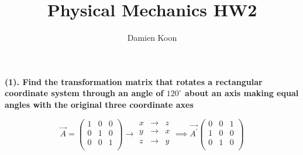 \documentclass[12pt]{article}
\date{\vspace{-4ex}}
\title{Physical Mechanics HW2}
\author{Damien Koon}
\begin{document}
\maketitle

\textbf{(1). Find the transformation matrix that rotates a rectangular coordinate system
through an angle of $120^\circ$ about an axis making equal angles with the original three coordinate
axes}

\hfill \break
{}

$$
\vec{A} = 
\begin{pmatrix}
    1 & 0 & 0 \\
	0 & 1 & 0  \\
	0 & 0 & 1 \\
\end{pmatrix} \rightarrow
\begin{matrix}
    x & \rightarrow & z \\
	y & \rightarrow & x  \\
	z & \rightarrow & y \\
\end{matrix} \implies \vec{A^{\prime}}
\begin{pmatrix}
    0 & 0 & 1 \\
	1 & 0 & 0  \\
	0 & 1 & 0 \\
\end{pmatrix}
$$
\end{document}
